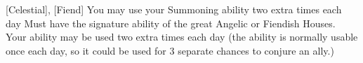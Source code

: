 {[Celestial], [Fiend]}
\shortdescfeat
{You may use your Summoning ability two extra times each day}
{Must have the signature  ability of the great Angelic or Fiendish Houses.}
{Your  ability may be used two extra times each day (the ability is normally usable once each day, so it could be used for 3 separate chances to conjure an ally.)}